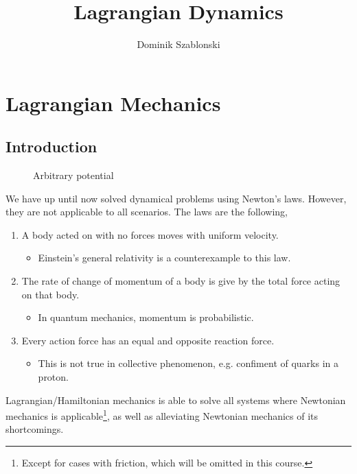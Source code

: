 \documentclass{book}
\title{Lagrangian Dynamics}
\author{Dominik Szablonski}
\begin{document}
\maketitle

\tableofcontents

\chapter{Lagrangian Mechanics}
\section{Introduction}
\begin{figure}
	\centering
	\caption{Arbitrary potential} \label{fig:arbitrary potential}
\end{figure}
We have up until now solved dynamical problems using Newton's laws. However, they are not applicable to all scenarios. The laws are the following,
\begin{enumerate}
	\item A body acted on with no forces moves with uniform velocity.
	\begin{itemize}
		\item Einstein's general relativity is a counterexample to this law.
	\end{itemize}
	\item The rate of change of momentum of a body is give by the total force acting on that body.
	\begin{itemize}
		\item In quantum mechanics, momentum is probabilistic.
	\end{itemize}
	\item Every action force has an equal and opposite reaction force.
	\begin{itemize}
		\item This is not true in collective phenomenon, e.g. confiment of quarks in a proton.
	\end{itemize}
\end{enumerate}
Lagrangian/Hamiltonian mechanics is able to solve all systems where Newtonian mechanics is applicable\footnote{Except for cases with friction, which will be omitted in this course.}, as well as alleviating Newtonian mechanics of its shortcomings.
\end{document}
